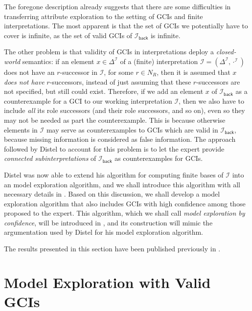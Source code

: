 The foregone description already suggests that there are some difficulties in transferring
attribute exploration to the setting of GCIs and finite interpretations.  The most
apparent is that the set of GCIs we potentially have to cover is infinite, as the set of
valid GCIs of $\mathcal{I}_{\mathsf{back}}$ is infinite.

The other problem is that validity of GCIs in interpretations deploy a \emph{closed-world}
semantics: if an element $x \in \Delta^{\mathcal{I}}$ of a (finite) interpretation
$\mathcal{I} = (\Delta^{\mathcal{I}}, \cdot^{\mathcal{I}})$ does not have an $r$-successor
in $\mathcal{I}$, for some $r \in N_{R}$, then it is assumed that $x$ \emph{does not have}
$r$-successors, instead of just assuming that these $r$-successors are not specified, but
still could exist.  Therefore, if we add an element $x$ of $\mathcal{I}_{\mathsf{back}}$
as a counterexample for a GCI to our working interpretation $\mathcal{I}$, then we also
have to include \emph{all} its role successors (and their role successors, and so on),
even so they may not be needed as part the counterexample.  This is because otherwise
elements in $\mathcal{I}$ may serve as counterexamples to GCIs which are valid in
$\mathcal{I}_{\mathsf{back}}$, because missing information is considered as false
information.  The approach followed by Distel to account for this problem is to let the
expert provide \emph{connected subinterpretations} of $\mathcal{I}_{\mathsf{back}}$ as
counterexamples for GCIs.

Distel was now able to extend his algorithm for computing finite bases of $\mathcal{I}$
into an model exploration algorithm, and we shall introduce this algorithm with all
necessary details in .  Based on this discussion, we shall
develop a model exploration algorithm that also includes GCIs with high confidence among
those proposed to the expert.  This algorithm, which we shall call \emph{model exploration
by confidence}, will be introduced in , and its construction
will mimic the argumentation used by Distel for his model exploration algorithm.

The results presented in this section have been published previously in
\cite{Borc-LTCS-13-11}.

\section{Model Exploration with Valid GCIs}
\label{sec:model-expl-with}

